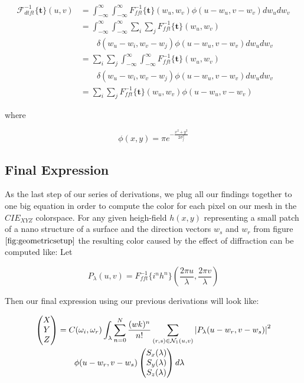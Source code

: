 \begin{align}
\mathcal{F}_{dtft}^{-1}\{\mathbf{t}\}(u,v)
& = \int_{-\infty}^{\infty} \int_{-\infty}^{\infty} {F}_{fft}^{-1}\{\mathbf{t}\}(w_u,w_v) \phi(u-w_u, v-w_v) dw_u dw_v \nonumber \\
& = \int_{-\infty}^{\infty} \int_{-\infty}^{\infty} \sum_i \sum_j {F}_{fft}^{-1}\{\mathbf{t}\}(w_u,w_v) \nonumber \\ 
& \quad \quad \delta(w_u-w_i, w_v-w_j)\phi(u-w_u, v-w_v) dw_u dw_v \nonumber \\
& = \sum_i \sum_j \int_{-\infty}^{\infty} \int_{-\infty}^{\infty}  {F}_{fft}^{-1}\{\mathbf{t}\}(w_u,w_v) \nonumber \\
& \quad \quad \delta(w_u-w_i, w_v-w_j)\phi(u-w_u, v-w_v) dw_u dw_v \nonumber \\
& = \sum_i \sum_j {F}_{fft}^{-1}\{\mathbf{t}\}(w_u,w_v) \phi(u-w_u, v-w_v)
\end{align}

where 

\begin{equation} \label{eq:gaussweight}
 \phi(x,y) = \pi e^{-\frac{x^2 + y^2}{2\sigma_{f}^2}}
\end{equation} 

\subsection{Final Expression}
As the last step of our series of derivations, we plug all our findings together to one big equation in order to compute the color for each pixel on our mesh in the $CIE_{XYZ}$ colorspace. For any given heigh-field $h(x,y)$ representing a small patch of a nano structure of a surface and the direction vectors $w_s$ and $w_r$ from figure $\ref{fig:geometricsetup}$ the resulting color caused by the effect of diffraction can be computed like: Let 

\begin{equation}
P_{\lambda}(u,v) = {F}_{fft}^{-1}\{i^n h^n\}(\frac{2\pi u}{\lambda},\frac{2\pi v}{\lambda})
\end{equation}

Then our final expression using our previous derivations will look like:

\begin{equation}
\begin{split}
\colvec[X]{Y}{Z}& = C(\omega_i,\omega_r) \int_{\lambda} \sum_{n=0}^N  \frac{(wk)^n}{n!} \sum_{(r,s) \in \mathcal{N}_1(u,v)} \left| P_{\lambda}(u-w_r,v-w_s) \right|^2 \\
& \quad \quad  \phi(u-w_r, v-w_s) \colvec[S_x(\lambda)]{S_y(\lambda)}{S_z(\lambda)}d\lambda
\end{split}
\label{eq:finalexpression}
\end{equation}

